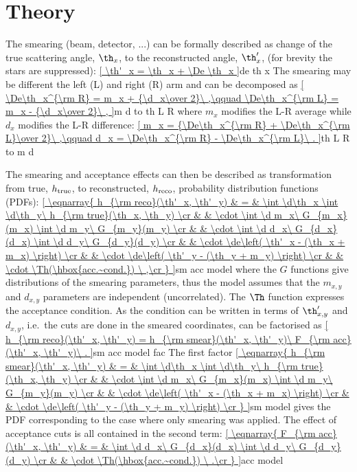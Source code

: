 \section{Theory}

\vskip3mm

The smearing (beam, detector, ...) can be formally described as change of the true scattering angle, $\th_x$, to the reconstructed angle, $\th'_x$, (for brevity the stars are suppressed):
\eqref{
\th'_x = \th_x + \De \th_x
}{de th x}
The smearing may be different the left (L) and right (R) arm and can be decomposed as
\eqref{
\De\th_x^{\rm R} = m_x + {\d_x\over 2}\ ,\qquad \De\th_x^{\rm L} = m_x - {\d_x\over 2}\ ,
}{m d to th L R}
where $m_x$ modifies the L-R average while $d_x$ modifies the L-R difference:
\eqref{
m_x = {\De\th_x^{\rm R} + \De\th_x^{\rm L}\over 2}\ ,\qquad d_x = \De\th_x^{\rm R} - \De\th_x^{\rm L}\ .
}{th L R to m d}

The smearing and acceptance effects can then be described as transformation from true, $h_{\rm true}$, to reconstructed, $h_{\rm reco}$, probability distribution functions (PDFs):
\eqref{
\eqnarray{
	h_{\rm reco}(\th'_x, \th'_y) & = & \int \d\th_x \int \d\th_y\ h_{\rm true}(\th_x, \th_y) \cr
								 &  & \cdot \int \d m_x\ G_{m_x}(m_x) \int \d m_y\ G_{m_y}(m_y) \cr
								 &  & \cdot \int \d d_x\ G_{d_x}(d_x) \int \d d_y\ G_{d_y}(d_y) \cr
								 &  & \cdot \de\left( \th'_x - (\th_x + m_x) \right) \cr
								 &  & \cdot \de\left( \th'_y - (\th_y + m_y) \right) \cr
								 &  & \cdot \Th(\hbox{acc.~cond.}) \ ,\cr
}
}{sm acc model}
where the $G$ functions give distributions of the smearing parameters, thus the model assumes that the $m_{x,y}$ and $d_{x,y}$ parameters are independent (uncorrelated). The $\Th$ function expresses the acceptance condition. As the condition can be written in terms of $\th'_{x,y}$ and $d_{x,y}$, i.e.~the cuts are done in the smeared coordinates,  can be factorised as
\eqref{
	h_{\rm reco}(\th'_x, \th'_y) = h_{\rm smear}(\th'_x, \th'_y)\ F_{\rm acc}(\th'_x, \th'_y)\ .
}{sm acc model fac}
The first factor
\eqref{
\eqnarray{
	h_{\rm smear}(\th'_x, \th'_y) & = & \int \d\th_x \int \d\th_y\ h_{\rm true}(\th_x, \th_y) \cr
								 &  & \cdot \int \d m_x\ G_{m_x}(m_x) \int \d m_y\ G_{m_y}(m_y) \cr
								 &  & \cdot \de\left( \th'_x - (\th_x + m_x) \right) \cr
								 &  & \cdot \de\left( \th'_y - (\th_y + m_y) \right) \cr
}
}{sm model}
gives the PDF corresponding to the case where only smearing was applied. The effect of acceptance cuts is all contained in the second term:
\eqref{
\eqnarray{
	F_{\rm acc}(\th'_x, \th'_y) & = & \int \d d_x\ G_{d_x}(d_x) \int \d d_y\ G_{d_y}(d_y) \cr
								 &  & \cdot \Th(\hbox{acc.~cond.}) \ .\cr
}
}{acc model}

